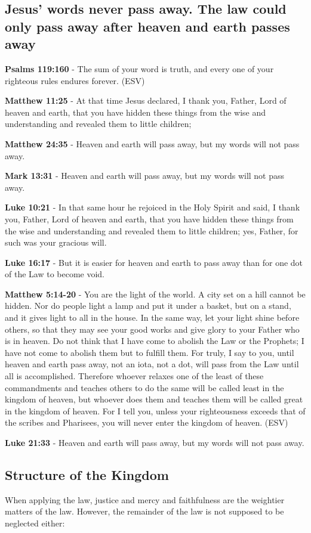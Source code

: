 \documentclass[11pt]{article}
\begin{document}
\subsection{Jesus' words never pass away. The law could only pass away after heaven and earth passes away}
\label{sec:org52c982a}
\textbf{Psalms 119:160} - The sum of your word is truth, and every one of your righteous rules endures forever. (ESV)

\textbf{Matthew 11:25} - At that time Jesus declared, I thank you, Father, Lord of heaven and earth, that you have hidden these things from the wise and understanding and revealed them to little children;

\textbf{Matthew 24:35} - Heaven and earth will pass away, but my words will not pass away.

\textbf{Mark 13:31} - Heaven and earth will pass away, but my words will not pass away.

\textbf{Luke 10:21} - In that same hour he rejoiced in the Holy Spirit and said, I thank you, Father, Lord of heaven and earth, that you have hidden these things from the wise and understanding and revealed them to little children; yes, Father, for such was your gracious will.

\textbf{Luke 16:17} - But it is easier for heaven and earth to pass away than for one dot of the Law to become void.

\textbf{Matthew 5:14-20} - You are the light of the world. A city set on a hill cannot be hidden. Nor do people light a lamp and put it under a basket, but on a stand, and it gives light to all in the house. In the same way, let your light shine before others, so that they may see your good works and give glory to your Father who is in heaven. Do not think that I have come to abolish the Law or the Prophets; I have not come to abolish them but to fulfill them. For truly, I say to you, until heaven and earth pass away, not an iota, not a dot, will pass from the Law until all is accomplished. Therefore whoever relaxes one of the least of these commandments and teaches others to do the same will be called least in the kingdom of heaven, but whoever does them and teaches them will be called great in the kingdom of heaven. For I tell you, unless your righteousness exceeds that of the scribes and Pharisees, you will never enter the kingdom of heaven. (ESV)

\textbf{Luke 21:33} - Heaven and earth will pass away, but my words will not pass away.

\subsection{Structure of the Kingdom}
\label{sec:org2f95697}
When applying the law, justice and mercy and faithfulness are the weightier matters of the law.
However, the remainder of the law is not supposed to be neglected either:
\end{document}

